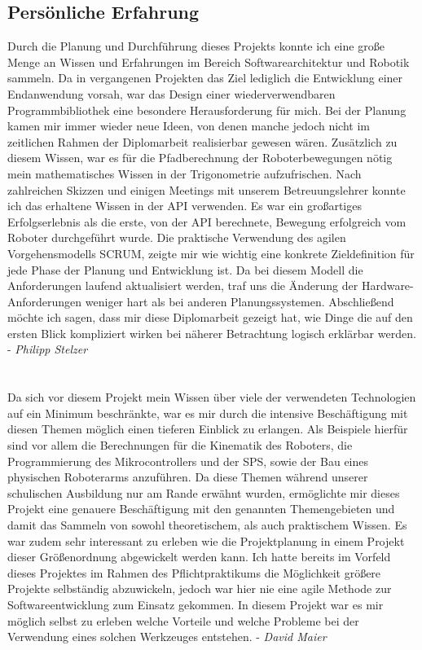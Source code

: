 \subsection{Persönliche Erfahrung}
\par
\begingroup
\leftskip=1cm 
\rightskip=1cm 
\noindent
Durch die Planung und Durchführung dieses Projekts konnte ich eine große Menge an Wissen und Erfahrungen im Bereich Softwarearchitektur und Robotik sammeln. Da in vergangenen Projekten das Ziel lediglich die Entwicklung einer Endanwendung vorsah, war das Design einer wiederverwendbaren Programmbibliothek eine besondere Herausforderung für mich. Bei der Planung kamen mir immer wieder neue Ideen, von denen manche jedoch nicht im zeitlichen Rahmen der Diplomarbeit realisierbar gewesen wären. Zusätzlich zu diesem Wissen, war es für die Pfadberechnung der Roboterbewegungen nötig mein mathematisches Wissen in der Trigonometrie aufzufrischen. Nach zahlreichen Skizzen und einigen Meetings mit unserem Betreuungslehrer konnte ich das erhaltene Wissen in der API verwenden. Es war ein großartiges Erfolgserlebnis als die erste, von der API berechnete, Bewegung erfolgreich vom Roboter durchgeführt wurde. Die praktische Verwendung des agilen Vorgehensmodells SCRUM, zeigte mir wie wichtig eine konkrete Zieldefinition für jede Phase der Planung und Entwicklung ist. Da bei diesem Modell die Anforderungen laufend aktualisiert werden, traf uns die Änderung der Hardware-Anforderungen weniger hart als bei anderen Planungssystemen. Abschließend möchte ich sagen, dass mir diese Diplomarbeit gezeigt hat, wie Dinge die auf den ersten Blick kompliziert wirken bei näherer Betrachtung logisch erklärbar werden. - \textit{Philipp Stelzer}
\\\\
\\
Da sich vor diesem Projekt mein Wissen über viele der verwendeten Technologien auf ein Minimum beschränkte, war es mir durch die intensive Beschäftigung mit diesen Themen möglich einen tieferen Einblick zu erlangen. Als Beispiele hierfür sind vor allem die Berechnungen für die Kinematik des Roboters, die Programmierung des Mikrocontrollers und der SPS, sowie der Bau eines physischen Roboterarms anzuführen. Da diese Themen während unserer schulischen Ausbildung nur am Rande erwähnt wurden, ermöglichte mir dieses Projekt eine genauere Beschäftigung mit den genannten Themengebieten und damit das Sammeln von sowohl theoretischem, als auch praktischem Wissen.
Es war zudem sehr interessant zu erleben wie die Projektplanung in einem Projekt dieser Größenordnung abgewickelt werden kann. Ich hatte bereits im Vorfeld dieses Projektes im Rahmen des Pflichtpraktikums die Möglichkeit größere Projekte selbständig abzuwickeln, jedoch war hier nie eine agile Methode zur Softwareentwicklung zum Einsatz gekommen. 
\newpage
In diesem Projekt war es mir möglich selbst zu erleben welche Vorteile und welche Probleme bei der Verwendung eines solchen Werkzeuges entstehen.  - \textit{David Maier}
\par
\endgroup
